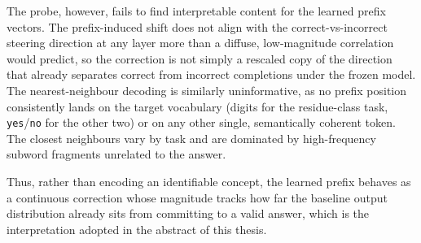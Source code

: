 The probe, however, fails to find interpretable content for the learned prefix vectors. The prefix-induced shift does not align with
the correct-vs-incorrect steering direction at any layer more than a diffuse,
low-magnitude correlation would predict, so the correction is not simply a rescaled
copy of the direction that already separates correct from incorrect completions
under the frozen model. The nearest-neighbour decoding is similarly uninformative, as
no prefix position consistently lands on the target vocabulary (digits for the
residue-class task, \texttt{yes}/\texttt{no} for the other two) or on any other
single, semantically coherent token. The closest neighbours vary by task and are
dominated by high-frequency subword fragments unrelated to the answer.
 
Thus, rather than encoding an identifiable
concept, the learned prefix behaves as a continuous correction whose magnitude
tracks how far the baseline output distribution already sits from committing to a
valid answer, which is the interpretation adopted in the abstract of this thesis.

